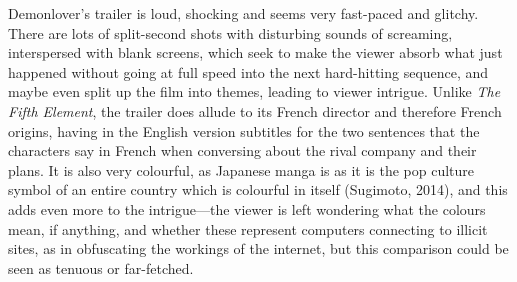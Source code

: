 \documentclass[12pt,a4paper]{article}
\begin{document}
Demonlover's trailer is loud, shocking and seems very fast-paced and
glitchy. There are lots of split-second shots with disturbing sounds
of screaming, interspersed with blank screens, which seek to make the
viewer absorb what just happened without going at full speed into the
next hard-hitting sequence, and maybe even split up the film into
themes, leading to viewer intrigue. Unlike \textit{The Fifth Element},
the trailer does allude to its French director and therefore French
origins, having in the English version subtitles for the two sentences
that the characters say in French when conversing about the rival
company and their plans. It is also very colourful, as Japanese manga
is as it is the pop culture symbol of an entire country which is
colourful in itself (Sugimoto, 2014), and this adds even more to the
intrigue---the viewer is left wondering what the colours mean, if
anything, and whether these represent computers connecting to illicit
sites, as in obfuscating the workings of the internet, but this
comparison could be seen as tenuous or far-fetched.\\
\end{document}
